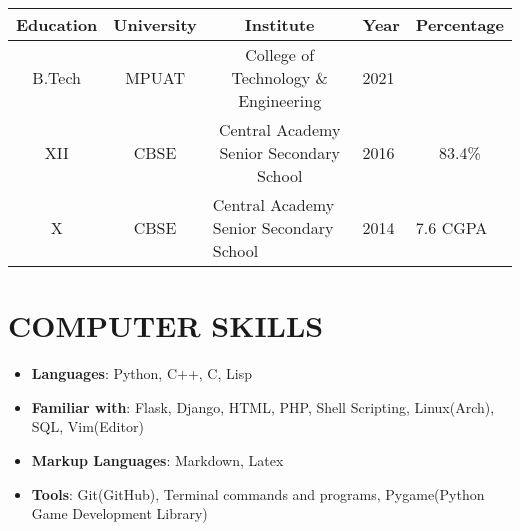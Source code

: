 \documentclass{res}[12pt]
\begin{document}
\begin{resume}
\begin{center}
\begin{tabular}{cccll}
\hline
\textbf{Education} & \textbf{University} & \textbf{Institute}                                          & \textbf{Year} & \textbf{Percentage}          \\ \hline
B.Tech             & MPUAT               & College of Technology \& Engineering
	& 2021          & \multicolumn{1}{c}{} \\ \hline
XII                & CBSE                & Central Academy Senior Secondary School                     & 2016          & \multicolumn{1}{c}{83.4\%}   \\ \hline
X                  & CBSE                & \multicolumn{1}{l}{Central Academy Senior Secondary School} & 2014          & 7.6 CGPA                     \\ \hline
\end{tabular}
\end{center}

\section{\large{COMPUTER SKILLS}}
	\begin{itemize}
		\item \textbf{Languages}: Python, C++, C, Lisp
		\item \textbf{Familiar with}: Flask, Django, HTML, PHP, Shell Scripting, Linux(Arch), SQL, Vim(Editor)
		\item \textbf{Markup Languages}: Markdown, Latex
		\item \textbf{Tools}: Git(GitHub), Terminal commands and programs, Pygame(Python Game Development Library)
	\end{itemize}


\end{resume}
\end{document}

